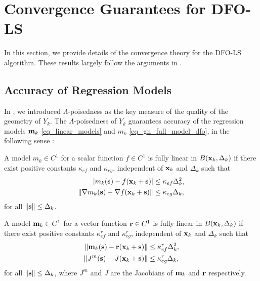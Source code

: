 \section{Convergence Guarantees for DFO-LS} \label{sec_convergence}
In this section, we provide details of the convergence theory for the DFO-LS algorithm.
These results largely follow the arguments in \cite[Section 3]{Cartis2017a}.

\subsection{Accuracy of Regression Models} \label{sec_fully_linear}
In , we introduced $\Lambda$-poisedness as the key measure of the quality of the geometry of $Y_k$.
The $\Lambda$-poisedness of $Y_k$ guarantees accuracy of the regression models $\mathbf{m}_k$ \eqref{eq_linear_models} and $m_k$ \eqref{eq_gn_full_model_dfo}, in the following sense \cite{Conn2009,Grapiglia2016}:

\begin{definition}
	A model $m_k\in C^1$ for a scalar function $f\in C^1$ is fully linear in $B(\mathbf{x}_k,\Delta_k)$ if there exist positive constants $\kappa_{ef}$ and $\kappa_{eg}$, independent of $\mathbf{x}_k$ and $\Delta_k$ such that
	\begin{align}
		|m_k(\mathbf{s}) - f(\mathbf{x}_k+\mathbf{s})| &\leq \kappa_{ef}\Delta_k^2, \\
		\|\nabla m_k(\mathbf{s}) - \nabla f(\mathbf{x}_k+\mathbf{s})\| &\leq \kappa_{eg}\Delta_k,
	\end{align}
	for all $\|\mathbf{s}\|\leq\Delta_k$.
\end{definition}

\begin{definition}
	A model $\mathbf{m}_k\in C^1$ for a vector function $\mathbf{r}\in C^1$ is fully linear in $B(\mathbf{x}_k,\Delta_k)$ if there exist positive constants $\kappa_{ef}^r$ and $\kappa_{eg}^r$, independent of $\mathbf{x}_k$ and $\Delta_k$ such that
	\begin{align}
		\|\mathbf{m}_k(\mathbf{s}) - \mathbf{r}(\mathbf{x}_k+\mathbf{s})\| &\leq \kappa_{ef}^r\Delta_k^2, \\
		\|J^m(\mathbf{s}) - J(\mathbf{x}_k+\mathbf{s})\| &\leq \kappa_{eg}^r\Delta_k,
	\end{align}
	for all $\|\mathbf{s}\|\leq\Delta_k$, where $J^m$ and $J$ are the Jacobians of $\mathbf{m}_k$ and $\mathbf{r}$ respectively.
\end{definition}

